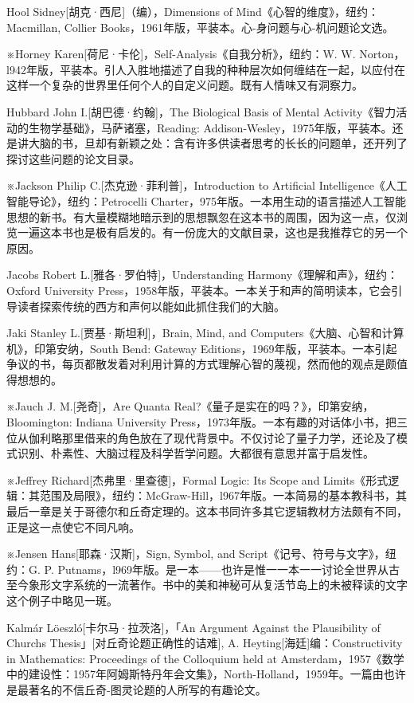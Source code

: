 \documentclass[
  12pt,
  twoside,
  openright,
  oldfontcommands,
]{memoir}
\begin{document}
Hool Sidney{[}胡克·西尼{]}（编），Dimensions of
Mind《心智的维度》，纽约：Macmillan, Collier
Books，1961年版，平装本。心-身问题与心-机问题论文选。

※Horney Karen{[}荷尼·卡伦{]}，Self-Analysis《自我分析》，纽约：W. W.
Norton，l942年版，平装本。引人入胜地描述了自我的种种层次如何缠结在一起，以应付在这样一个复杂的世界里任何个人的自定义问题。既有人情味又有洞察力。

Hubbard John I.{[}胡巴德·约翰{]}，The Biological Basis of Mental
Activity《智力活动的生物学基础》，马萨诸塞，Reading:
Addison-Wesley，1975年版，平装本。还是讲大脑的书，旦却有新颖之处：含有许多供读者思考的长长的问题单，还开列了探讨这些问题的论文目录。

※Jackson Philip C.{[}杰克逊·菲利普{]}，Introduction to Artificial
Intelligence《人工智能导论》，纽约：Petrocelli
Charter，975年版。一本用生动的语言描述人工智能思想的新书。有大量模糊地暗示到的思想飘忽在这本书的周围，因为这一点，仅浏览一遍这本书也是极有启发的。有一份庞大的文献目录，这也是我推荐它的另一个原因。

Jacobs Robert L.{[}雅各·罗伯特{]}，Understanding
Harmony《理解和声》，纽约：Oxford University
Press，1958年版，平装本。一本关于和声的简明读本，它会引导读者探索传统的西方和声何以能如此抓住我们的大脑。

Jaki Stanley L.{[}贾基·斯坦利{]}，Brain, Mind, and
Computers《大脑、心智和计算机》，印第安纳，South Bend: Gateway
Editions，1969年版，平装本。一本引起争议的书，每页都散发着对利用计算的方式理解心智的蔑视，然而他的观点是颇值得想想的。

※Jauch J. M.{[}尧奇{]}，Are Quanta Real?《量子是实在的吗？》，印第安纳，
Bloomington: Indiana University
Press，1973年版。一本有趣的对话体小书，把三位从伽利略那里借来的角色放在了现代背景中。不仅讨论了量子力学，还论及了模式识别、朴素性、大脑过程及科学哲学问题。大都很有意思并富于启发性。

※Jeffrey Richard{[}杰弗里·里查德{]}，Formal Logic: Its Scope and
Limits《形式逻辑：其范围及局限》，纽约：McGraw-Hill，l967年版。一本简易的基本教科书，其最后一章是关于哥德尔和丘奇定理的。这本书同许多其它逻辑教材方法颇有不同，正是这一点使它不同凡响。

※Jensen Hans{[}耶森·汉斯{]}，Sign, Symbol, and
Script《记号、符号与文字》，纽约：G. P.
Putnam\textquotesingle s，l969年版。是一本------也许是惟一一本一一讨论全世界从古至今象形文字系统的一流著作。书中的美和神秘可从复活节岛上的未被释读的文字这个例子中略见一斑。

Kalmár Löeszló{[}卡尔马·拉茨洛{]}，「An Argument Against the
Plausibility of Church\textquotesingle s
Thesis」{[}对丘奇论题正确性的诘难{]}, A.
Heyting{[}海廷{]}编：Constructivity in Mathematics: Proceedings of the
Colloquium held at
Amsterdam，1957《数学中的建设性：1957年阿姆斯特丹年会文集》，North-Holland，1959年。一篇由也许是最著名的不信丘奇-图灵论题的人所写的有趣论文。
\end{document}
